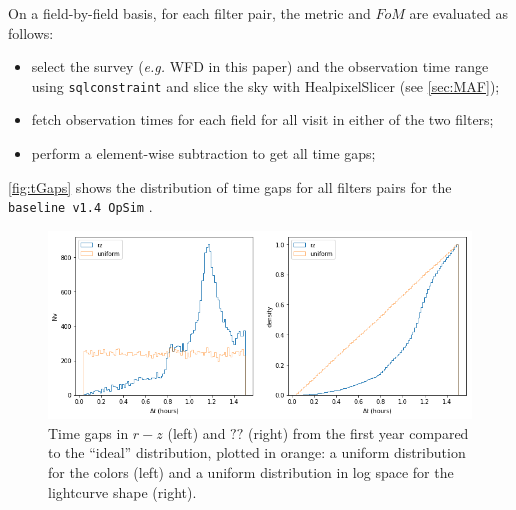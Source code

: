 On a field-by-field basis, for each filter pair, the metric and $FoM$ are evaluated as follows:

\begin{itemize}
    \item select the survey (\emph{e.g.} WFD in this paper) and the observation time range using {\tt sqlconstraint} and slice the sky with HealpixelSlicer (see \autoref{sec:MAF}); 
    \item fetch observation times for each field for all visit in either of the two filters;
    \item perform a element-wise subtraction to get all time gaps;
\end{itemize}
\autoref{fig:tGaps} shows the distribution of time gaps for all filters pairs for the \texttt{baseline v1.4  OpSim} . 


\begin{figure}[t!]
\centering
\includegraphics[scale=0.5]{figures/dkl_rz.png}
\caption{
Time gaps in $r-z$ (left) and $??$ (right) from the first year  compared to the ``ideal'' distribution, plotted in orange: a uniform distribution for the colors (left) and a uniform distribution in log space for the lightcurve shape (right).  }
\label{fig:tGaps}
\end{figure}

